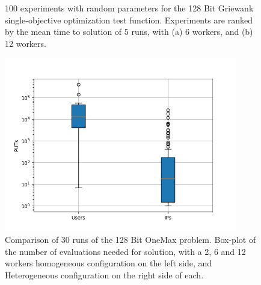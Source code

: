 \documentclass{llncs}
\begin{document}
\begin{figure}[t]
    \centering

    \caption{100 experiments with random parameters for the 128 Bit Griewank 
    single-objective optimization test function. Experiments are ranked by 
    the mean time to solution of 5 runs, with (a) 6 workers, and (b) 12 workers.}
    \label{fig:griewank}
\end{figure}


\begin{figure}[t]
    \centering
        \includegraphics[width=4in]{img/puts_box.png}
    \caption{Comparison of 30 runs of the 128 Bit OneMax problem. 
    Box-plot of the number of evaluations needed for solution, with a 2, 6 and 12 workers
    homogeneous configuration on the left side, and Heterogeneous configuration on the
    right side of each.
    }
    \label{fig:comp-onemax}
\end{figure}
\end{document}
